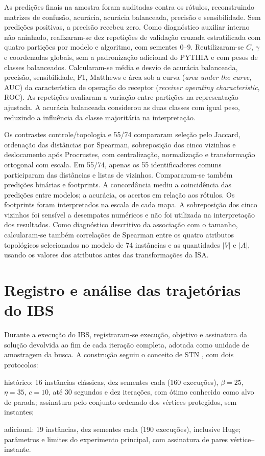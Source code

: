 As predições finais na amostra foram auditadas contra os rótulos,
reconstruindo matrizes de confusão, acurácia, acurácia balanceada,
precisão e sensibilidade. Sem predições positivas, a precisão recebeu zero.
Como diagnóstico auxiliar interno não aninhado, realizaram-se dez repetições
de validação cruzada estratificada com quatro partições por modelo e
algoritmo, com sementes 0--9. Reutilizaram-se
$C$, $\gamma$ e coordenadas globais, sem a padronização adicional do
PYTHIA e com pesos de classes balanceados. Calcularam-se média e desvio de
acurácia balanceada, precisão, sensibilidade, F1, Matthews e área sob a curva
(\textit{area under the curve}, AUC) da característica de operação do receptor
(\textit{receiver operating characteristic}, ROC).
As repetições avaliaram a variação entre partições na representação ajustada.
A acurácia balanceada considerou as duas classes com igual peso,
reduzindo a influência da classe majoritária na interpretação.

Os contrastes controle/topologia e 55/74 compararam seleção pelo Jaccard,
ordenação das distâncias por Spearman, sobreposição dos cinco vizinhos e
deslocamento após Procrustes, com centralização, normalização e transformação
ortogonal com escala. Em 55/74, apenas os 55 identificadores comuns
participaram das distâncias e listas de vizinhos. Compararam-se também
predições binárias e footprints. A concordância mediu a coincidência das
predições entre modelos; a acurácia, os acertos em relação aos rótulos.
Os footprints foram interpretados na escala de cada mapa.
A sobreposição dos cinco vizinhos foi sensível a desempates numéricos e
não foi utilizada na interpretação dos resultados. Como diagnóstico
descritivo da associação com o tamanho, calcularam-se também correlações
de Spearman entre os quatro atributos topológicos selecionados no modelo
de 74 instâncias e as quantidades $|V|$ e $|A|$, usando os valores dos
atributos antes das transformações da ISA.

\section{Registro e análise das trajetórias do IBS}\label{sec:met-trajetorias}

Durante a execução do IBS, registraram-se
execução, objetivo e assinatura da solução devolvida ao fim de cada
iteração completa, adotada como unidade de amostragem da busca.
A construção seguiu o conceito de STN
\cite{ChaconSartoriEtAl2023,OchoaMalanBlum2021}, com dois protocolos:
\begin{alineas}
 \item histórico: 16 instâncias clássicas, dez sementes cada (160 execuções),
 $\beta=25$, $\eta=35$, $c=10$, até 30 segundos e dez iterações, com ótimo
 conhecido como alvo de parada; assinatura pelo conjunto ordenado dos
 vértices protegidos, sem instantes;
 \item adicional: 19 instâncias, dez sementes cada (190 execuções), inclusive
 Huge; parâmetros e limites do experimento principal, com assinatura de pares
 vértice--instante.
\end{alineas}

